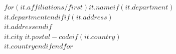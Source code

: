 $for(it.affiliations/first)$\textbf{\color{black}$it.name$}$if(it.department)$\\$it.department$$endif$$if(it.address)$\\$it.address$$endif$\\$it.city$ $it.postal-code$$if(it.country)$\\$it.country$$endif$$endfor$
